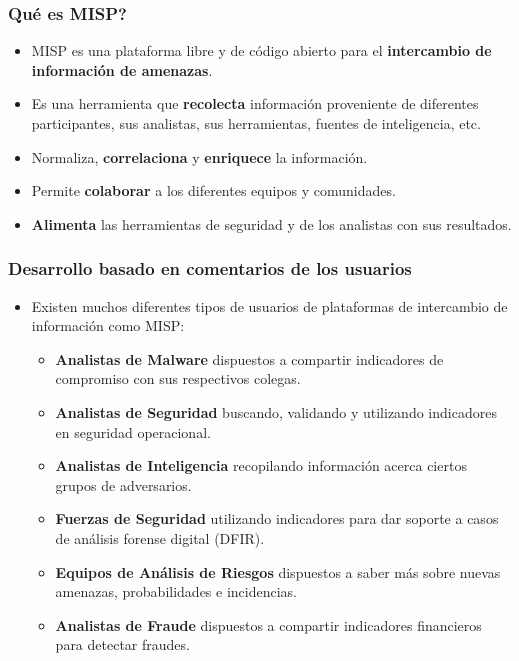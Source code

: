 \begin{frame}
\frametitle{Qué es MISP?}
\begin{itemize}
       \item MISP es una plataforma libre y de código abierto para el {\bf intercambio de información de amenazas}.
       \item Es una herramienta que {\bf recolecta} información proveniente de diferentes participantes, sus analistas, sus herramientas, fuentes de inteligencia, etc.
       \item Normaliza, {\bf correlaciona} y {\bf enriquece} la información.
       \item Permite {\bf colaborar} a los diferentes equipos y comunidades.
       \item {\bf Alimenta} las herramientas de seguridad y de los analistas con sus resultados.
\end{itemize}
\end{frame}

\begin{frame}
\frametitle{Desarrollo basado en comentarios de los usuarios}
\begin{itemize}
\item Existen muchos diferentes tipos de usuarios de plataformas de intercambio de información como MISP: 
        \begin{itemize}
                \item {\bf Analistas de Malware} dispuestos a compartir indicadores de compromiso con sus respectivos colegas.
                \item {\bf Analistas de Seguridad} buscando, validando y utilizando indicadores en seguridad operacional.
                \item {\bf Analistas de Inteligencia} recopilando información acerca ciertos grupos de adversarios.
                \item {\bf Fuerzas de Seguridad} utilizando indicadores para dar soporte a casos de análisis forense digital (DFIR).
                \item {\bf Equipos de Análisis de Riesgos} dispuestos a saber más sobre nuevas amenazas, probabilidades e incidencias.
                \item {\bf Analistas de Fraude} dispuestos a compartir indicadores financieros para detectar fraudes.
        \end{itemize}
\end{itemize}
\end{frame}

